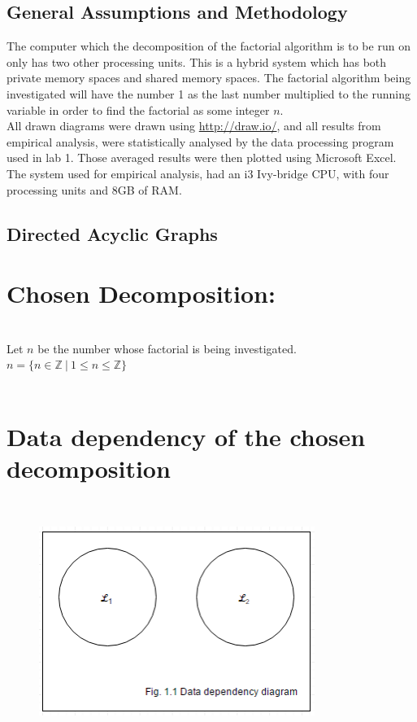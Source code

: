\documentclass[11pt]{article}
\begin{document}
\begin{page}

\clearpage
\setcounter{page}{1}

\section{General Assumptions and Methodology}
The computer which the decomposition of the factorial algorithm is to be run on only has two other processing units. This is a hybrid system which has both private memory spaces and shared memory spaces. The factorial algorithm being investigated will have the number 1 as the last number multiplied to the running variable in order to find the factorial as some integer $n$.\\

\noindent All drawn diagrams were drawn using \url{http://draw.io/}, and all results from empirical analysis, were statistically analysed by the data processing program used in lab 1. Those averaged results were then plotted using Microsoft Excel.\\

\noindent The system used for empirical analysis, had an i3 Ivy-bridge CPU, with four processing units and 8GB of RAM.

\section{Directed Acyclic Graphs}
\noindent \chapter{Chosen Decomposition:} \\
\noindent Let $n$ be the number whose factorial is being investigated. \\
$ n = \{ n \in \mathbb{Z}\ |\ 1 \leq n \leq \mathbb{Z}\} $ 
\\\\
\noindent \chapter{Data dependency of the chosen decomposition} \\
\begin{figure}[ht]
\centering
     \includegraphics[width=0.80\textwidth]{parallel_fig_1_1}
\end{figure}


\end{page}
\end{document}
